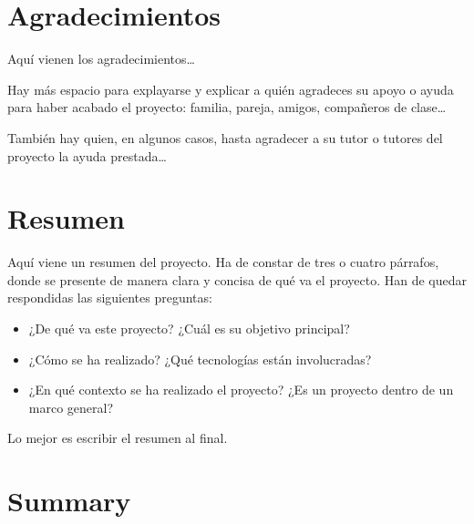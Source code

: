 \documentclass[a4paper, 12pt]{book}
\begin{document}

\chapter*{Agradecimientos}

Aquí vienen los agradecimientos\ldots

Hay más espacio para explayarse y explicar a quién agradeces su apoyo o ayuda para
haber acabado el proyecto: familia, pareja, amigos, compañeros de clase\ldots

También hay quien, en algunos casos, hasta agradecer a su tutor o tutores del proyecto
la ayuda prestada\ldots


\chapter*{Resumen}

Aquí viene un resumen del proyecto.
Ha de constar de tres o cuatro párrafos, donde se presente de manera clara y concisa de qué va el proyecto. 
Han de quedar respondidas las siguientes preguntas:

\begin{itemize}
  \item ¿De qué va este proyecto? ¿Cuál es su objetivo principal?
  \item ¿Cómo se ha realizado? ¿Qué tecnologías están involucradas?
  \item ¿En qué contexto se ha realizado el proyecto? ¿Es un proyecto dentro de un marco general?
\end{itemize}

Lo mejor es escribir el resumen al final.


\chapter*{Summary}
\end{document}
